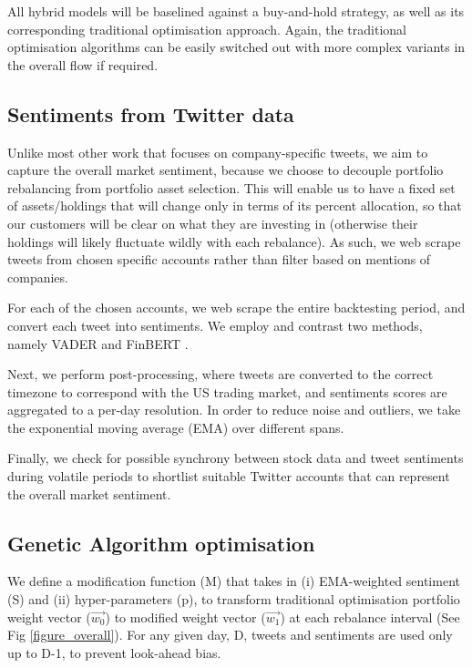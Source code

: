 \documentclass{article}
\begin{document}
All hybrid models will be baselined against a buy-and-hold strategy, as well as its corresponding traditional optimisation approach. Again, the traditional optimisation algorithms can be easily switched out with more complex variants in the overall flow if required.

\subsection{Sentiments from Twitter data}
Unlike most other work that focuses on company-specific tweets, we aim to capture the overall market sentiment, because we choose to decouple portfolio rebalancing from portfolio asset selection. This will enable us to have a fixed set of assets/holdings that will change only in terms of its percent allocation, so that our customers will be clear on what they are investing in (otherwise their holdings will likely fluctuate wildly with each rebalance). As such, we web scrape tweets from chosen specific accounts rather than filter based on mentions of companies.

For each of the chosen accounts, we web scrape the entire backtesting period, and convert each tweet into sentiments. We employ and contrast two methods, namely VADER \cite{VADER} and FinBERT \cite{araci2019finbert}.

Next, we perform post-processing, where tweets are converted to the correct timezone to correspond with the US trading market, and sentiments scores are aggregated to a per-day resolution. In order to reduce noise and outliers, we take the exponential moving average (EMA) over different spans.

Finally, we check for possible synchrony between stock data and tweet sentiments during volatile periods to shortlist suitable Twitter accounts that can represent the overall market sentiment.

\subsection{Genetic Algorithm optimisation}

We define a modification function (M) that takes in (i) EMA-weighted sentiment (S) and (ii) hyper-parameters (p), to transform traditional optimisation portfolio weight vector ($\vec{w_0}$) to modified weight vector ($\vec{w_1}$) at each rebalance interval (See Fig \ref{figure_overall}). For any given day, D, tweets and sentiments are used only up to D-1, to prevent look-ahead bias.
\end{document}
